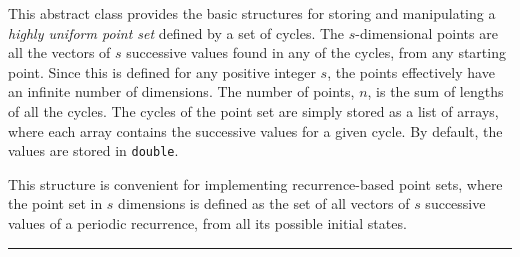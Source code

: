 
This abstract class provides the basic structures for
storing and manipulating a \emph{highly uniform point set}
 defined by a set of cycles.
The $s$-dimensional points are all the vectors of $s$ successive
values found in any of the cycles, from any starting point.
Since this is defined for any positive integer $s$, the points
effectively have an infinite number of dimensions.
The number of points, $n$, is the sum of lengths of all the cycles.
The cycles of the point set are simply stored as a list of arrays,
where each array contains the successive values for a given cycle.
By default, the values are stored in \texttt{double}.

This structure is convenient for implementing recurrence-based point
sets, where the point set in $s$ dimensions is defined as
the set of all vectors of $s$ successive values of a periodic recurrence,
from all its possible initial states.

\bigskip\hrule\bigskip

